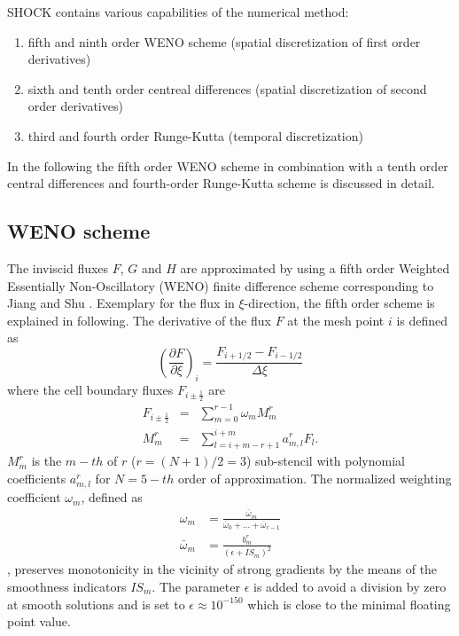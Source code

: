 SHOCK contains various capabilities of the numerical method: 
\begin{enumerate}
\item fifth and ninth order WENO scheme (spatial discretization of first order derivatives)
\item sixth and tenth order centreal differences (spatial discretization of second order derivatives)
\item third and fourth order Runge-Kutta (temporal discretization)
\end{enumerate}
In the following the fifth order WENO scheme in combination with a tenth order central differences and fourth-order Runge-Kutta scheme is discussed in detail.

\subsection{WENO scheme}
The inviscid fluxes $F$, $G$ and $H$ are approximated by using a fifth order Weighted Essentially Non-Oscillatory (WENO) finite difference scheme corresponding to Jiang and Shu \cite{Jiang1996}.
Exemplary for the flux in $\xi$-direction, the fifth order scheme is explained in following.
The derivative of the flux $F$ at the mesh point $i$ is defined as
\begin{equation}
\left( \frac{\partial F}{\partial \xi} \right)_i =\frac{F_{i+ 1/2} -F_{i-1/2}}{\varDelta \xi}
\end{equation}
where the cell boundary fluxes $F_{i \pm \frac{1}{2}}$ are
\begin{eqnarray}
F_{i\pm \frac{1}{2}} & =& \sum_{m=0}^{r-1} \omega_m M^r_m
\\ \nonumber
M^r_m & =& \sum_{l=i+m-r+1}^{i+m} a^r_{m,l} F_{l}.
\label{eq:eq4}
\end{eqnarray}
$M^r_m$ is the $m-th$ of $r$ ($r=(N+1)/2=3$) sub-stencil with polynomial coefficients $a^r_{m,l}$ for $N=5-th$ order of approximation.
The normalized weighting coefficient $\omega_m$, defined as
\begin{eqnarray}
\label{eq:omega}
\omega_m &= \frac{\bar{\omega}_m}{\bar{\omega}_0+...+\bar{\omega}_{r-1}}
\\ \nonumber
\bar{\omega}_m &= \frac{b_m^r}{\left(\epsilon+IS_m\right)^2}
\end{eqnarray}
, preserves monotonicity in the vicinity of strong gradients by the means of the smoothness indicators $IS_m$.
The parameter $\epsilon$ is added to avoid a division by zero at smooth solutions and is set to $\epsilon \approx 10^{-150}$ which is close to the minimal floating point value.
